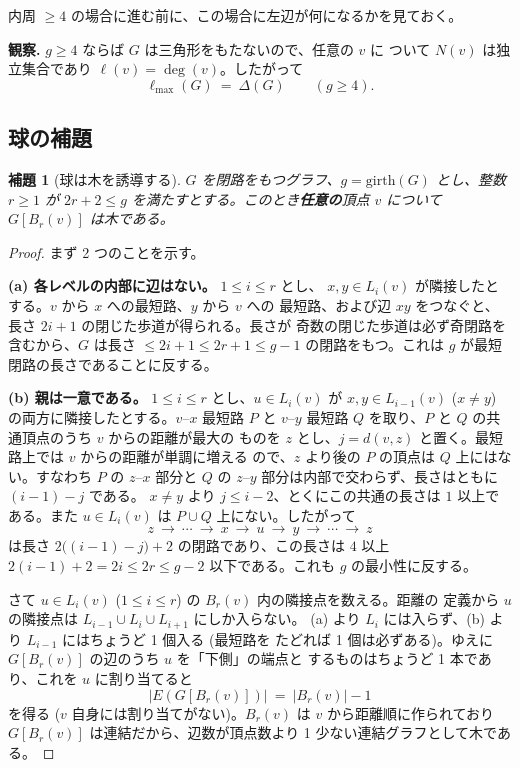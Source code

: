 \documentclass[paper=a4,fontsize=10.5pt,jafontsize=10.5pt]{jlreq}
\theoremstyle{plain}
\newtheorem{lemma}[theorem]{補題}
\theoremstyle{definition}
\begin{document}
内周 $\ge 4$ の場合に進む前に、この場合に左辺が何になるかを見ておく。

\medskip
\noindent
\textbf{観察.} $g \ge 4$ ならば $G$ は三角形をもたないので、任意の $v$ に
ついて $N(v)$ は独立集合であり $\ell(v) = \deg(v)$。したがって
\[ \ell_{\max}(G) \ = \ \Delta(G) \qquad (g \ge 4). \]

\subsection{球の補題}

\begin{lemma}[球は木を誘導する]\label{lem:ball}
$G$ を閉路をもつグラフ、$g = \mathrm{girth}(G)$ とし、整数 $r \ge 1$ が
$2r + 2 \le g$ を満たすとする。このとき\textbf{任意の}頂点 $v$ について
$G[B_r(v)]$ は木である。
\end{lemma}

\begin{proof}
まず 2 つのことを示す。

\textbf{(a) 各レベルの内部に辺はない。} $1 \le i \le r$ とし、
$x, y \in L_i(v)$ が隣接したとする。$v$ から $x$ への最短路、$y$ から $v$ への
最短路、および辺 $xy$ をつなぐと、長さ $2i + 1$ の閉じた歩道が得られる。長さが
奇数の閉じた歩道は必ず奇閉路を含むから、$G$ は長さ $\le 2i + 1 \le 2r + 1
\le g - 1$ の閉路をもつ。これは $g$ が最短閉路の長さであることに反する。

\textbf{(b) 親は一意である。} $1 \le i \le r$ とし、$u \in L_i(v)$ が
$x, y \in L_{i-1}(v)$ ($x \ne y$) の両方に隣接したとする。$v$--$x$ 最短路 $P$ と
$v$--$y$ 最短路 $Q$ を取り、$P$ と $Q$ の共通頂点のうち $v$ からの距離が最大の
ものを $z$ とし、$j = d(v,z)$ と置く。最短路上では $v$ からの距離が単調に増える
ので、$z$ より後の $P$ の頂点は $Q$ 上にはない。すなわち $P$ の $z$--$x$ 部分と
$Q$ の $z$--$y$ 部分は内部で交わらず、長さはともに $(i-1) - j$ である。
$x \ne y$ より $j \le i - 2$、とくにこの共通の長さは $1$ 以上である。また
$u \in L_i(v)$ は $P \cup Q$ 上にない。したがって
\[ z \ \to \ \cdots \ \to \ x \ \to \ u \ \to \ y \ \to \ \cdots \ \to \ z \]
は長さ $2\bigl((i-1)-j\bigr) + 2$ の閉路であり、この長さは $4$ 以上
$2(i-1) + 2 = 2i \le 2r \le g - 2$ 以下である。これも $g$ の最小性に反する。

さて $u \in L_i(v)$ ($1 \le i \le r$) の $B_r(v)$ 内の隣接点を数える。距離の
定義から $u$ の隣接点は $L_{i-1} \cup L_i \cup L_{i+1}$ にしか入らない。
(a) より $L_i$ には入らず、(b) より $L_{i-1}$ にはちょうど 1 個入る (最短路を
たどれば 1 個は必ずある)。ゆえに $G[B_r(v)]$ の辺のうち $u$ を「下側」の端点と
するものはちょうど 1 本であり、これを $u$ に割り当てると
\[ |E(G[B_r(v)])| \ = \ |B_r(v)| - 1 \]
を得る ($v$ 自身には割り当てがない)。$B_r(v)$ は $v$ から距離順に作られており
$G[B_r(v)]$ は連結だから、辺数が頂点数より 1 少ない連結グラフとして木である。
\end{proof}
\end{document}
